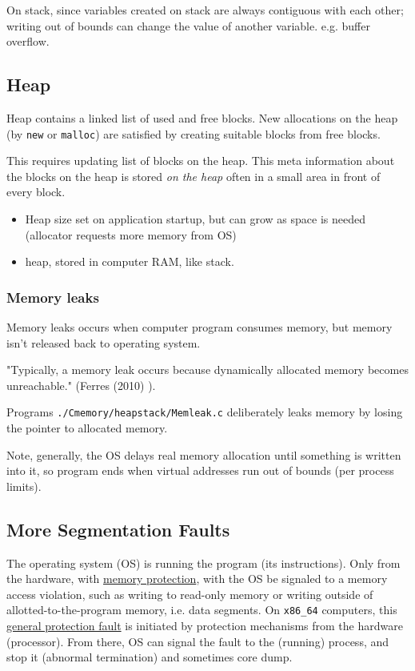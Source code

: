 \documentclass[10pt]{amsart}
\begin{document}
On stack, since variables created on stack are always contiguous with each other; writing out of bounds can change the value of another variable.  e.g. buffer overflow.  


\subsection{Heap}  

Heap contains a linked list of used and free blocks.  New allocations on the heap (by \verb|new| or \verb|malloc|) are satisfied by creating suitable blocks from free blocks.  

This requires updating list of blocks on the heap.  This meta information about the blocks on the heap is stored \emph{on the heap} often in a small area in front of every block.  

\begin{itemize}
	\item Heap size set on application startup, but can grow as space is needed (allocator requests more memory from OS)
	\item heap, stored in computer RAM, like stack.
\end{itemize}

\subsubsection{Memory leaks}  

Memory leaks occurs when computer program consumes memory, but memory isn't released back to operating system.  

"Typically, a memory leak occurs because dynamically allocated memory becomes unreachable."  (Ferres (2010) \cite{Ferr2010}).  

Programs \verb|./Cmemory/heapstack/Memleak.c| deliberately leaks memory by losing the pointer to allocated memory.  

Note, generally, the OS delays real memory allocation until something is written into it, so program ends when virtual addresses run out of bounds (per process limits).  

\subsection{More Segmentation Faults}  

The operating system (OS) is running the program (its instructions).  Only from the hardware, with \href{https://en.wikipedia.org/wiki/Memory_protection}{memory protection}, with the OS be signaled to a memory access violation, such as writing to read-only memory or writing outside of allotted-to-the-program memory, i.e. data segments.  On \verb|x86_64| computers, this \href{https://en.wikipedia.org/wiki/General_protection_fault}{general protection fault} is initiated by protection mechanisms from the hardware (processor).  From there, OS can signal the fault to the (running) process, and stop it (abnormal termination) and sometimes core dump. 
\end{document}
